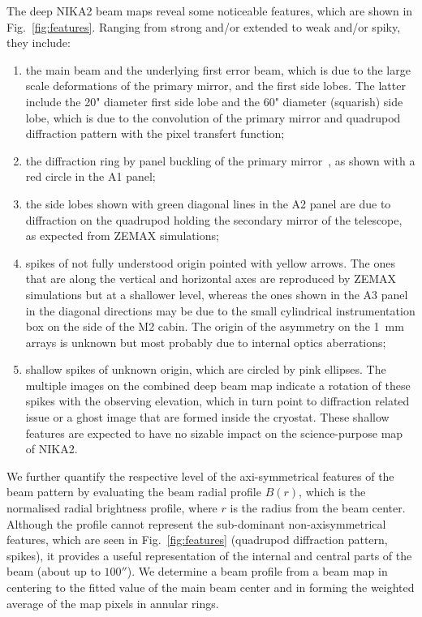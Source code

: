 The deep NIKA2 beam maps reveal some noticeable features, which are
shown in Fig.~\ref{fig:features}. Ranging from strong and/or extended to
weak and/or spiky, they include:
\begin{enumerate}
\item the main beam and the underlying first error
  beam, which is due to the large scale deformations of the primary
  mirror, and the first side lobes. The latter include 
  the 20" diameter first side lobe and the 60" diameter (squarish)
  side lobe, which is due to the convolution of the primary mirror and quadrupod
  diffraction pattern with the pixel transfert function;
\item the diffraction ring by panel buckling of the primary
  mirror~\citep{Greve2010}, as shown with a red circle in the A1 panel;
\item the side lobes shown with green
  diagonal lines in the A2 panel are due to diffraction on the
  quadrupod holding the secondary mirror of the telescope, as expected
  from ZEMAX simulations;  
\item spikes of not fully understood origin pointed with yellow
  arrows. The ones that are along the vertical and
  horizontal axes are reproduced by ZEMAX simulations but at a 
  shallower level, whereas the ones shown in the A3 panel in the
  diagonal directions may be due to the small cylindrical
  instrumentation box on the side of the M2 cabin. The origin of the
  asymmetry on the 1~mm arrays is unknown but most probably due to
  internal optics aberrations;
\item shallow spikes of unknown origin, which are circled by pink
  ellipses. The multiple images on the combined deep beam map indicate
  a rotation of these spikes with the observing elevation, which in
  turn point to diffraction related issue or a ghost image that are
  formed inside the cryostat. These shallow features are expected to
  have no sizable impact on the science-purpose map of NIKA2.
\end{enumerate}

We further quantify the respective level of the axi-symmetrical
features of the beam pattern by evaluating the beam radial profile
$B(r)$, which is the normalised radial brightness profile,
where $r$ is the radius from the beam center.
Although the profile cannot represent the sub-dominant non-axisymmetrical
features, which are seen in Fig.~\ref{fig:features} (quadrupod
diffraction pattern, spikes), it provides a useful
representation of the internal and central parts of the beam (about up to
$100''$). We determine a beam profile from a beam map in centering to
the fitted value of the main beam center and in forming the
weighted average of the map pixels in annular rings.

